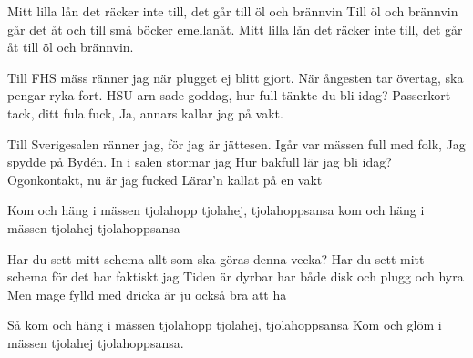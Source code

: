 
\songtext{} \leftrepeat Mitt lilla lån det räcker inte till,
det går till öl och brännvin \rightrepeat
Till öl och brännvin går det åt
och till små böcker emellanåt.
Mitt lilla lån det räcker inte till, 
det går åt till öl och brännvin.

\songinfo{}Till FHS mäss ränner jag 
när plugget ej blitt gjort.
När ångesten tar övertag,
ska pengar ryka fort.
HSU-arn sade goddag, 
hur full tänkte du bli idag?
Passerkort tack, ditt fula fuck,
Ja, annars kallar jag på vakt.

Till Sverigesalen ränner jag,
för jag är jättesen.
Igår var mässen full med folk, 
Jag spydde på Bydén.
In i salen stormar jag
Hur bakfull lär jag bli idag?
Ogonkontakt, nu är jag fucked
Lärar'n kallat på en vakt


\songtext{}Kom och häng i mässen
tjolahopp tjolahej, tjolahoppsansa
kom och häng i mässen
tjolahej tjolahoppsansa

Har du sett mitt schema
allt som ska göras denna vecka?
Har du sett mitt schema
för det har faktiskt jag
Tiden är dyrbar
har både disk och plugg och hyra
Men mage fylld med dricka
är ju också bra att ha

Sả kom och häng i mässen
tjolahopp tjolahej, tjolahoppsansa
Kom och glöm i mässen
tjolahej tjolahoppsansa.